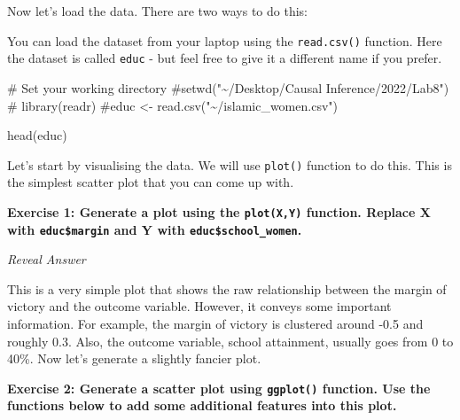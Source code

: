 \documentclass[
  letterpaper,
  DIV=11,
  numbers=noendperiod]{scrreprt}
\newenvironment{Shaded}{\begin{snugshade}}{\end{snugshade}}
\newcommand{\CommentTok}[1]{\textcolor[rgb]{0.37,0.37,0.37}{#1}}
\newcommand{\FunctionTok}[1]{\textcolor[rgb]{0.28,0.35,0.67}{#1}}
\newcommand{\NormalTok}[1]{\textcolor[rgb]{0.00,0.23,0.31}{#1}}
\newcommand{\SpecialCharTok}[1]{\textcolor[rgb]{0.37,0.37,0.37}{#1}}
\begin{document}
\hfill\break

Now let's load the data. There are two ways to do this:

You can load the dataset from your laptop using the \texttt{read.csv()}
function. Here the dataset is called \texttt{educ} - but feel free to
give it a different name if you prefer.

\begin{Shaded}
\begin{Highlighting}[]
\CommentTok{\# Set your working directory}
\CommentTok{\#setwd("\textasciitilde{}/Desktop/Causal Inference/2022/Lab8")}
\CommentTok{\# }
\FunctionTok{library}\NormalTok{(readr)}
\CommentTok{\#educ \textless{}{-} read.csv("\textasciitilde{}/islamic\_women.csv")}

\FunctionTok{head}\NormalTok{(educ)}
\end{Highlighting}
\end{Shaded}

Let's start by visualising the data. We will use \texttt{plot()}
function to do this. This is the simplest scatter plot that you can come
up with.

\textbf{Exercise 1: Generate a plot using the \texttt{plot(X,Y)}
function. Replace X with \texttt{educ\$margin} and Y with
\texttt{educ\$school\_women}.}

\hfill\break

\emph{Reveal Answer}

\begin{Shaded}
\end{Shaded}

This is a very simple plot that shows the raw relationship between the
margin of victory and the outcome variable. However, it conveys some
important information. For example, the margin of victory is clustered
around -0.5 and roughly 0.3. Also, the outcome variable, school
attainment, usually goes from 0 to 40\%. Now let's generate a slightly
fancier plot.

\hfill\break

\textbf{Exercise 2: Generate a scatter plot using \texttt{ggplot()}
function. Use the functions below to add some additional features into
this plot.}
\end{document}
